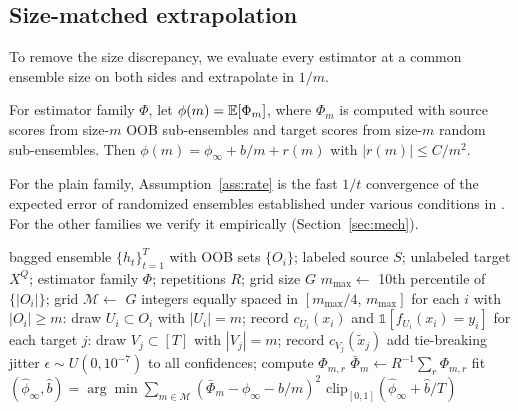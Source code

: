 \subsection{Size-matched extrapolation}

To remove the size discrepancy, we evaluate every estimator at a common ensemble size on both sides and extrapolate in $1/m$.

\begin{assumption}[$1/m$ expansion]
\label{ass:rate}
For estimator family $\Phi$, let $\phi(m)=\mathbb{E}[\Phi_m]$, where $\Phi_m$ is computed with source scores from size-$m$ OOB sub-ensembles and target scores from size-$m$ random sub-ensembles. Then $\phi(m)=\phi_\infty+b/m+r(m)$ with $|r(m)|\le C/m^2$.
\end{assumption}
For the plain family, Assumption~\ref{ass:rate} is the fast $1/t$ convergence of the expected error of randomized ensembles established under various conditions in \citep{ng2001voting,lopes2016sharp,cannings2017rp}. For the other families we verify it empirically (Section~\ref{sec:mech}).

\begin{algorithm}[t]
\caption{Size-matched, $1/m$-extrapolated OOB estimation (OOB-$\Phi$-X)}
\label{alg:x}
\begin{algorithmic}[1]
\Require bagged ensemble $\{h_t\}_{t=1}^T$ with OOB sets $\{O_i\}$; labeled source $S$; unlabeled target $X^Q$; estimator family $\Phi$; repetitions $R$; grid size $G$
\State $m_{\max}\gets$ 10th percentile of $\{|O_i|\}$; grid $\mathcal M\gets$ $G$ integers equally spaced in $[m_{\max}/4,\,m_{\max}]$
    \State for each $i$ with $|O_i|\ge m$: draw $U_i\subset O_i$ with $|U_i|=m$; record $c_{U_i}(x_i)$ and $\mathbb 1[f_{U_i}(x_i)=y_i]$
    \State for each target $j$: draw $V_j\subset[T]$ with $|V_j|=m$; record $c_{V_j}(\tilde x_j)$
    \State add tie-breaking jitter $\epsilon\sim U(0,10^{-7})$ to all confidences; compute $\Phi_{m,r}$
  \EndFor
  \State $\bar\Phi_m\gets R^{-1}\sum_r\Phi_{m,r}$
\EndFor
\State fit $(\hat\phi_\infty,\hat b)=\arg\min\sum_{m\in\mathcal M}(\bar\Phi_m-\phi_\infty-b/m)^2$
\State \Return $\mathrm{clip}_{[0,1]}(\hat\phi_\infty+\hat b/T)$
\end{algorithmic}
\end{algorithm}


